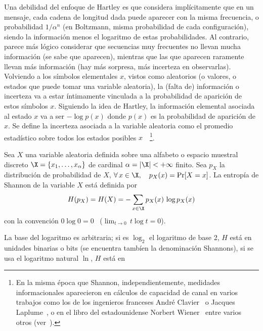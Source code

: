 Una debilidad del enfoque de Hartley es que considera impl\'icitamente que en un
mensaje, cada cadena de longitud dada  puede aparecer con la misma frecuencia, o
probabilidad   $1/\alpha^n$   (en   Boltzmann,   misma  probabilidad   de   cada
configuraci\'on),  siendo   la  informaci\'on   menos  el  logaritmo   de  estas
probabilidades.  Al  contrario, parece m\'as l\'ogico  considerar que secuencias
muy frecuentes  no llevan mucha  informaci\'on (se sabe que  aparecen), mientras
que las que  aparecen raramente llevan m\'as informaci\'on  (hay m\'as sorpresa,
m\'as incerteza  en observarlas).  Volviendo  a los s\'imbolos  elementales $x$,
vistos  como aleatorios  (o  valores, o  estados  que puede  tomar una  variable
aleatoria), la  (falta de)  informaci\'on o incerteza  va a  estar \'intimamente
vinculada a la probabilidad de aparici\'on de estos s\'imbolos $x$. Siguiendo la
idea de Hartley,  la informaci\'on elemental asociada al estado $x$  va a ser $-
\log p(x)$ donde $p(x)$ es la  probabilidad de aparici\'on de $x$.  Se define la
incerteza asociada a la variable  aleatoria como el promedio estad\'istico sobre
todos  los  estados posibles  $x$~\cite{Sha48,  ShaWea64}~\footnote{En la  misma
  \'epoca que Shannon, independientemente, medidades informacionales aparecieron
  en  c\'alculos de  capacidad  de canal  en  varios trabajos  como  los de  los
  ingenieros     franceses     Andr\'e     Clavier~\cite{Cla48}    o     Jacques
  Laplume~\cite{Lap48},   o    en   el   libro    del   estadounidense   Norbert
  Wiener~\cite[Cap.~III]{Wie48}  entre  varios  otros (ver~\cite[y  Ref.]{Ver98,
    Lun02, RioMag14, FlaRio16, RioFla17, Che17}).}.
%
\begin{definicion}\label{def:SZ:Shannon}
  Sea $X$ una variable aleatoria  definida sobre una alfabeto o espacio muestral
  discreto $\X = \{  x_1 , \ldots , x_\alpha \}$ de cardinal  $\alpha = |\X| < +
  \infty$  finito. Sea $p_X$  la distribuci\'on  de probabilidad  de $X$,  \ie $
  \forall \, x \in \X, \quad p_X(x)  = \Pr[X = x]$.  La entrop\'ia de Shannon de
  la variable $X$ est\'a definida por
  \[
    H(p_X) = H(X) = - \sum_{x \in \X} p_X(x) \, \log p_X(x)
  \]
  con la convenci\'on $0 \log 0 =  0$ \ ($\displaystyle \lim_{t \to 0} \, t \log
  t = 0$).
\end{definicion}
%
\noindent La  base del logaritmo es  arbitraria; si es $\log_2$  el logaritmo de
base  2, $H$  est\'a en  unidades  binarias o  bits (se  encuentra tamb\'ien  la
denominaci\'on Shannons),  si se usa el  logaritmo natural $\ln$,  $H$ est\'a en
